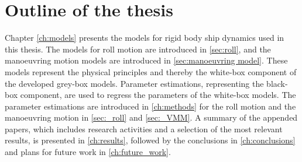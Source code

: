 %

\section{Outline of the thesis}
Chapter \ref{ch:models} presents the models for rigid body ship dynamics used in this thesis. The models for roll motion are introduced in \autoref{sec:roll}, and the manoeuvring motion models are introduced in  \autoref{sec:manoeuvring model}. These models represent the physical principles and thereby the white-box component of the developed grey-box models.
Parameter estimations, representing the black-box component, are used to regress the parameters of the white-box models. The parameter estimations are introduced in \autoref{ch:methods} for the roll motion and the manoeuvring motion in \autoref{sec:_roll} and \autoref{sec:_VMM}. 
A summary of the appended papers, which includes research activities and a selection of the most relevant results, is presented in \autoref{ch:results}, followed by the conclusions in \autoref{ch:conclusions} and plans for future work in \autoref{ch:future_work}.